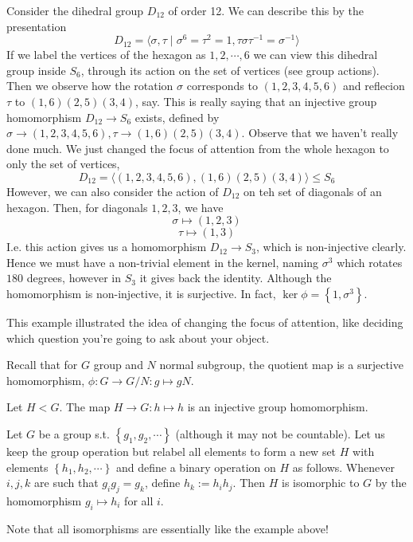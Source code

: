 \begin{example}
  Consider the dihedral group $D_{12}$ of order 12. We can describe this by the
  presentation
  \[D_{12}=\langle \sigma, \tau \mid \sigma^{6}=\tau^2=1, \tau\sigma\tau^{-1} =
  \sigma^{-1}\rangle\]
  If we label the vertices of the hexagon as $1,2,\cdots,6$ we can view this dihedral
  group inside $S_6$, through its action on the set of vertices (see group actions). Then
  we observe how the rotation $\sigma$ corresponds to $(1,2,3,4,5,6)$ and reflecion
  $\tau$ to $(1,6)(2,5)(3,4)$, say. This is really saying that an injective group
  homomorphism $D_{12}\to S_6$ exists, defined by $\sigma\to (1,2,3,4,5,6), \tau\to
  (1,6)(2,5)(3,4)$. Observe that we haven't really done much. We just changed the focus of
  attention from the whole hexagon to only the set of vertices,
  \[D_{12}=\langle (1,2,3,4,5,6),(1,6)(2,5)(3,4)\rangle \leq S_6\]
  However, we can also consider the action of $D_12$ on teh set of diagonals of an
  hexagon. Then, for diagonals $1,2,3$, we have 
  \[\sigma\mapsto (1,2,3)\]
  \[\tau\mapsto (1,3)\]
  I.e. this action gives us a homomorphism $D_{12}\to S_3$, which is non-injective
  clearly. Hence we must have a non-trivial element in the kernel, naming $\sigma^3$ which
  rotates $180$ degrees, however in $S_3$ it gives back the identity. Although the
  homomorphism is non-injective, it is surjective. In fact, $\ker\phi = \left\{ 1,\sigma^3
  \right\}$.
\end{example}
This example illustrated the idea of changing the focus of attention, like deciding which
question you're going to ask about your object.

\begin{example} 
  Recall that for $G$ group and $N$ normal subgroup, the quotient map is a surjective
  homomorphism, $\phi:G\to G/N : g\mapsto gN$.

  Let $H< G$. The map $H\to G:h\mapsto h$ is an injective group homomorphism.
\end{example}

\begin{example}
  Let $G$ be a group s.t. $\left\{ g_1,g_2,\cdots\right\}$ (although it may not be
  countable). Let us keep the group operation but relabel all elements to form a new set
  $H$ with elements $\left\{ h_1,h_2,\cdots \right\}$ and define a binary operation on $H$
  as follows. Whenever $i,j,k$ are such that $g_ig_j=g_k$, define $h_k:=h_ih_j$. Then $H$
  is isomorphic to $G$ by the homomorphism $g_i\mapsto h_i$ for all $i$.
\end{example}
Note that all isomorphisms are essentially like the example above!


